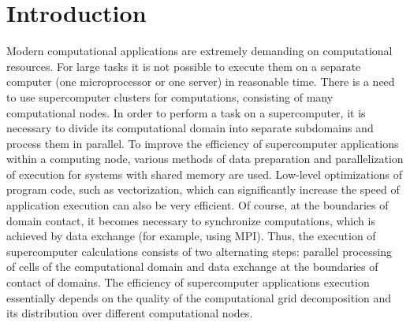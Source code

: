 \documentclass[
11pt,%
tightenlines,%
twoside,%
onecolumn,%
nofloats,%
nobibnotes,%
nofootinbib,%
superscriptaddress,%
noshowpacs,%
centertags]%
{revtex4}
\begin{document}
\section{Introduction}

Modern computational applications are extremely demanding on computational resources.
For large tasks it is not possible to execute them on a separate computer (one microprocessor or one server) in reasonable time.
There is a need to use supercomputer clusters for computations, consisting of many computational nodes.
In order to perform a task on a supercomputer, it is necessary to divide its computational domain into separate subdomains and process them in parallel.
To improve the efficiency of supercomputer applications within a computing node, various methods of data preparation and parallelization of execution for systems with shared memory are used.
Low-level optimizations of program code, such as vectorization, which can significantly increase the speed of application execution can also be very efficient.
Of course, at the boundaries of domain contact, it becomes necessary to synchronize computations, which is achieved by data exchange (for example, using MPI).
Thus, the execution of supercomputer calculations consists of two alternating steps: parallel processing of cells of the computational domain and data exchange at the boundaries of contact of domains.
The efficiency of supercomputer applications execution essentially depends on the quality of the computational grid decomposition and its distribution over different computational nodes.
\end{document}
